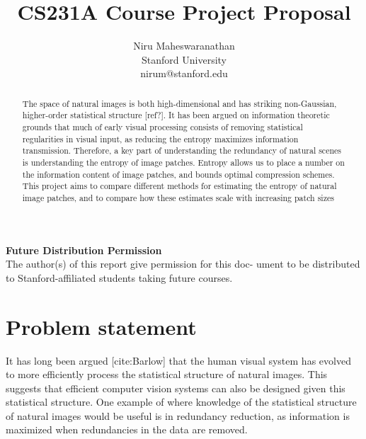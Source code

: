 \documentclass[10pt,twocolumn,letterpaper]{article}
\begin{document}
\title{CS231A Course Project Proposal}

\author{Niru Maheswaranathan\\
Stanford University\\
nirum@stanford.edu
}

\maketitle
\thispagestyle{empty}

\begin{abstract}
The space of natural images is both high-dimensional and has striking non-Gaussian, higher-order statistical structure [ref?]. It has been argued on information theoretic grounds that much of early visual processing consists of removing statistical regularities in visual input, as reducing the entropy maximizes information transmission. Therefore, a key part of understanding the redundancy of natural scenes is understanding the entropy of image patches. Entropy allows us to place a number on the information content of image patches, and bounds optimal compression schemes. This project aims to compare different methods for estimating the entropy of natural image patches, and to compare how these estimates scale with increasing patch sizes
\end{abstract}

\noindent\large\textbf{Future Distribution Permission}\\
\indent The author(s) of this report give permission for this doc- ument to be distributed to Stanford-affiliated students taking future courses.

\section{Problem statement}
It has long been argued [cite:Barlow] that the human visual system has evolved to more efficiently process the statistical structure of natural images. This suggests that efficient computer vision systems can also be designed given this statistical structure. One example of where knowledge of the statistical structure of natural images would be useful is in redundancy reduction, as information is maximized when redundancies in the data are removed.
\end{document}
